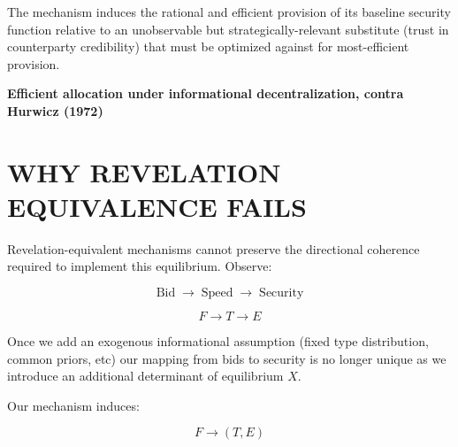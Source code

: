 \documentclass[11pt]{article}
\begin{document}
\vspace{0.35cm}

{\large

The mechanism induces the rational and efficient provision of its baseline
security function relative to an unobservable but strategically-relevant 
substitute (trust in counterparty credibility) that must be optimized 
against for most-efficient provision.


\vspace{0.35cm}

\textbf{Efficient allocation under informational decentralization, contra Hurwicz (1972)}
}

\newpage












\section*{\LARGE WHY REVELATION EQUIVALENCE FAILS}

{\large
\linespread{1.15}\selectfont

Revelation-equivalent mechanisms cannot preserve the directional coherence
required to implement this equilibrium. Observe:

}

\vspace{0.35cm}

\[
\boxed{
\text{Bid}
\;\longrightarrow\;
\text{Speed}
\;\longrightarrow\;
\text{Security}
}
\]

\[
F \rightarrow T \rightarrow E
\]

\vspace{0.35cm}

Once we add an exogenous informational assumption  (fixed type distribution, common priors, etc) our mapping from bids to security is no longer unique as we introduce an additional determinant of equilibrium $X$.

\vspace{0.35cm}

Our mechanism induces:

\vspace{0.35cm}


\[
F \rightarrow (T,E)
\]
\end{document}
